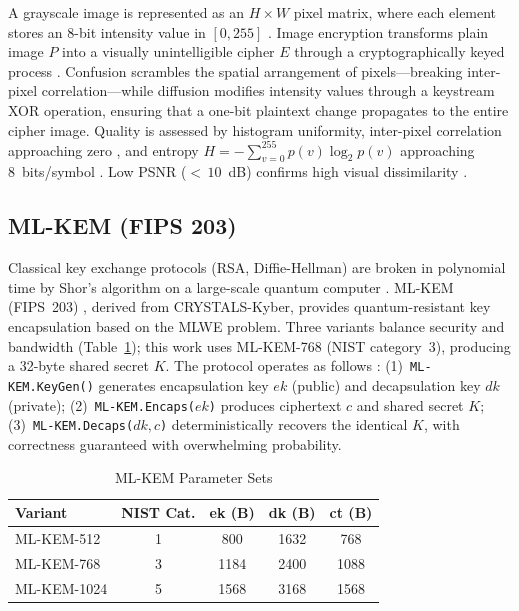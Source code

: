 \documentclass[conference]{IEEEtran}
\begin{document}
A grayscale image is represented as an $H \times W$ pixel matrix, where each element stores an 8-bit intensity value in $[0, 255]$ \cite{b13}. Image encryption transforms plain image $P$ into a visually unintelligible cipher $E$ through a cryptographically keyed process \cite{b12}. Confusion scrambles the spatial arrangement of pixels---breaking inter-pixel correlation---while diffusion modifies intensity values through a keystream XOR operation, ensuring that a one-bit plaintext change propagates to the entire cipher image. Quality is assessed by histogram uniformity, inter-pixel correlation approaching zero \cite{b14}, and entropy $H = -\sum_{v=0}^{255} p(v)\log_2 p(v)$ approaching 8~bits/symbol \cite{b15}. Low PSNR (${<}\,10$~dB) confirms high visual dissimilarity \cite{b12}.

\subsection{ML-KEM (FIPS 203)}

Classical key exchange protocols (RSA, Diffie-Hellman) are broken in polynomial time by Shor's algorithm on a large-scale quantum computer \cite{b18}. ML-KEM (FIPS~203) \cite{b6}, derived from CRYSTALS-Kyber, provides quantum-resistant key encapsulation based on the MLWE problem. Three variants balance security and bandwidth (Table~\ref{tab:mlkem}); this work uses ML-KEM-768 (NIST category~3), producing a 32-byte shared secret $K$. The protocol operates as follows \cite{b6}: (1)~\texttt{ML-KEM.KeyGen()} generates encapsulation key $\mathit{ek}$ (public) and decapsulation key $\mathit{dk}$ (private); (2)~\texttt{ML-KEM.Encaps($\mathit{ek}$)} produces ciphertext $c$ and shared secret $K$; (3)~\texttt{ML-KEM.Decaps($\mathit{dk},c$)} deterministically recovers the identical $K$, with correctness guaranteed with overwhelming probability.

\begin{table}[htbp]
	\caption{ML-KEM Parameter Sets \cite{b5,b27}}
	\label{tab:mlkem}
	\begin{center}
		\begin{tabular}{|l|c|c|c|c|}
			\hline
			\textbf{Variant} & \textbf{NIST Cat.} & \textbf{ek (B)} & \textbf{dk (B)} & \textbf{ct (B)} \\
			\hline
			ML-KEM-512  & 1 & 800  & 1632 & 768  \\
			ML-KEM-768  & 3 & 1184 & 2400 & 1088 \\
			ML-KEM-1024 & 5 & 1568 & 3168 & 1568 \\
			\hline
		\end{tabular}
	\end{center}
\end{table}
\end{document}
